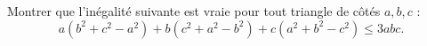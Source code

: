 Montrer que l'inégalité suivante est vraie pour tout triangle de côtés $a, b, c$ :
\[ a(b^2 + c^2 - a^2) + b(c^2 + a^2 - b^2) + c(a^2 + b^2 - c^2) \leq 3abc. \]
